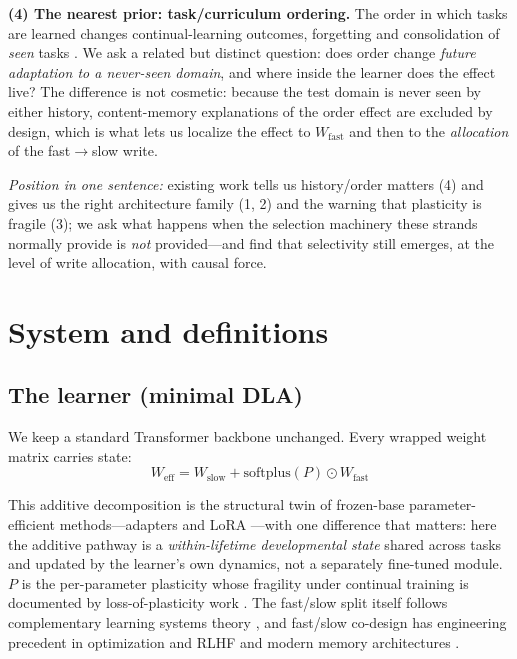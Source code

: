 \documentclass{article} %
\begin{document}
\textbf{(4) The nearest prior: task/curriculum ordering.} The order in which tasks are learned changes continual-learning outcomes, forgetting and consolidation of \emph{seen} tasks \citep{bell2022effect, li2025optimal, poirier2005effect, wang2022survey}. We ask a related but distinct question: does order change \emph{future adaptation to a never-seen domain}, and where inside the learner does the effect live? The difference is not cosmetic: because the test domain is never seen by either history, content-memory explanations of the order effect are excluded by design, which is what lets us localize the effect to $W_{\mathrm{fast}}$ and then to the \emph{allocation} of the fast$\to$slow write.

\emph{Position in one sentence:} existing work tells us history/order matters (4) and gives us the right architecture family (1, 2) and the warning that plasticity is fragile (3); we ask what happens when the selection machinery these strands normally provide is \emph{not} provided---and find that selectivity still emerges, at the level of write allocation, with causal force.

\section{System and definitions}
\label{sec:system}

\subsection{The learner (minimal DLA)}
\label{sec:learner}

We keep a standard Transformer backbone unchanged. Every wrapped weight matrix carries state:
\begin{equation}
W_{\mathrm{eff}} = W_{\mathrm{slow}} + \mathrm{softplus}(P)\odot W_{\mathrm{fast}}
\end{equation}

This additive decomposition is the structural twin of frozen-base parameter-efficient methods---adapters \citep{houlsby2019parameter} and LoRA \citep{hu2022lora, he2022towards}---with one difference that matters: here the additive pathway is a \emph{within-lifetime developmental state} shared across tasks and updated by the learner's own dynamics, not a separately fine-tuned module. $P$ is the per-parameter plasticity whose fragility under continual training is documented by loss-of-plasticity work \citep{dohare2024loss, lyle2022understanding, nikishin2022primacy}. The fast/slow split itself follows complementary learning systems theory \citep{mcclelland1995why, kumaran2016what}, and fast/slow co-design has engineering precedent in optimization and RLHF \citep{qi2024online} and modern memory architectures \citep{ba2016using, behrouz2025titans}.
\end{document}
